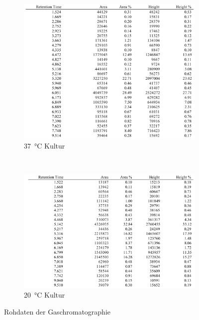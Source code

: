 \documentclass[a4paper,english]{scrreprt}
\begin{document}
\begin{figure}
	\centering
	\begin{subfigure}{.45\textwidth}
		\includegraphics[width=\linewidth]{img/gc_37_roh.png}
		\caption{\SI{37}{\celsius} Kultur}
		\label{fig:gc_37_roh}
	\end{subfigure}
	~
	\begin{subfigure}{.45\textwidth}
		\includegraphics[width=\linewidth]{img/gc_20_roh.png}
		\caption{\SI{20}{\celsius} Kultur}
		\label{fig:gc_20_roh}
	\end{subfigure}
	\label{fig:gc_roh}
	\caption{Rohdaten der Gaschromatographie}
\end{figure}
\end{document}
